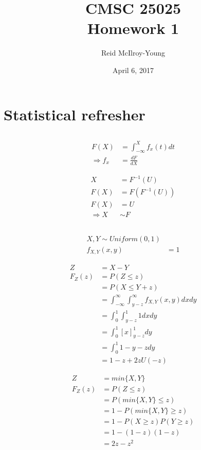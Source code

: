 \documentclass[12pt,a4paper]{article}
\author{Reid McIlroy-Young}
\title{CMSC 25025 \\ Homework 1}
\date{April 6, 2017}
\begin{document}
\maketitle

\section{Statistical refresher}
\subsection{}

\begin{align*}
F(X) &= \int_{-\infty}^{X} f_x(t) dt\\
\Rightarrow f_x&= \frac{dF}{dX}
\end{align*}

\begin{align*}
X &= F^{-1}(U)\\
F(X) &= F(F^{-1}(U))\\
F(X) &= U\\
\Rightarrow X &\sim F
\end{align*}

\subsection{}

\begin{align}
X, Y \sim Uniform(0,1)\\
f_{X,Y}(x,y) &= 1
\end{align}

\begin{align*}
Z &= X - Y\\
F_Z(z) &= P(Z \leq z)\\
&= P(X\leq  Y + z)\\
&= \int^{\infty}_{-\infty}\int^{\infty}_{y - z} f_{X,Y}(x,y) dx dy\\
&= \int^{1}_{0}\int^{1}_{y - z} 1 dx dy\\
&= \int^{1}_{0} [x]^1_{y - z} dy\\
&= \int^{1}_{0} 1 - y - z dy\\
&= 1 - z + 2 z U(-z)
\end{align*}

\begin{align*}
Z &= min\lbrace X, Y \rbrace\\
F_Z(z) &= P(Z \leq z)\\
&= P(min\lbrace X, Y \rbrace\leq z)\\
&= 1 - P(min\lbrace X, Y \rbrace\geq z)\\
&= 1 - P(X \geq z)P(Y \geq z)\\
&= 1 - (1 - z)(1 - z)\\
&= 2z - z^2
\end{align*}
\end{document}
